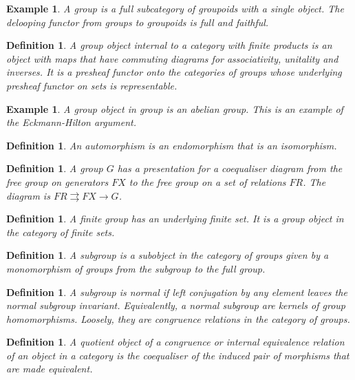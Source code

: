 \documentclass{tufte-book}
\newtheorem{definition}[theorem]{Definition}
\newtheorem{example}[theorem]{Example}
\begin{document}
\begin{example}
  A group is a full subcategory of groupoids with a single object. The delooping functor from groups to groupoids is full and faithful.
\end{example}

\begin{definition}
  A group object internal to a category with finite products is an object with maps that have commuting diagrams for associativity, unitality and inverses. It is a presheaf functor onto the categories of groups whose underlying presheaf functor on sets is representable.
\end{definition}

\begin{example}
  A group object in group is an abelian group. This is an example of the Eckmann-Hilton argument.
\end{example}

\begin{definition}
  An automorphism is an endomorphism that is an isomorphism.
\end{definition}

\begin{definition}
  A group $G$ has a presentation for a coequaliser diagram from the free group on generators $FX$ to the free group on a set of relations $FR$.
  The diagram is $FR \rightrightarrows FX \rightarrow G$.
\end{definition}

\begin{definition}
  A finite group has an underlying finite set. It is a group object in the category of finite sets.
\end{definition}

\begin{definition}
  A subgroup is a subobject in the category of groups given by a monomorphism of groups from the subgroup to the full group.
\end{definition}

\begin{definition}
  A subgroup is normal if left conjugation by any element leaves the normal subgroup invariant. Equivalently, a normal subgroup are kernels of group homomorphisms. Loosely, they are congruence relations in the category of groups.
\end{definition}

\begin{definition}
  A quotient object of a congruence or internal equivalence relation of an object in a category is the coequaliser of the induced pair of morphisms that are made equivalent.
\end{definition}
\end{document}
